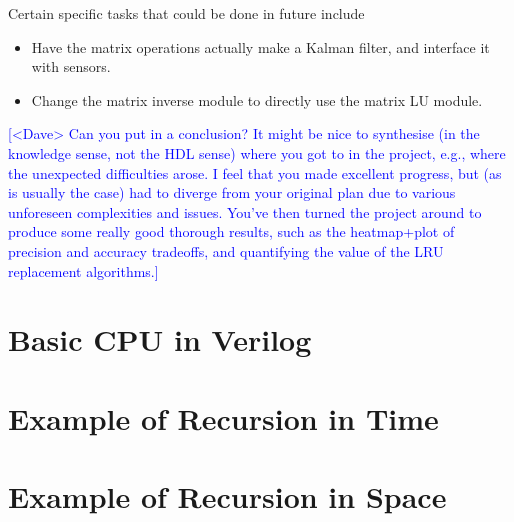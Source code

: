 \documentclass[12pt]{article}
\newcommand{\note}[2][red]{\textcolor{#1}{#2}}
\newcommand{\notedme}[1]{\note[blue]{[<Dave> #1]}}
\begin{document}
Certain specific tasks that could be done in future include

\begin{itemize}
	\item Have the matrix operations actually make a Kalman filter, and interface it with sensors.
	\item Change the matrix inverse module to directly use the matrix LU module.
\end{itemize}

\notedme{Can you put in a conclusion? It might be nice to synthesise (in the knowledge sense, not the HDL sense) where you got to in the project, e.g., where the unexpected difficulties arose. I feel that you made excellent progress, but (as is usually the case) had to diverge from your original plan due to various unforeseen complexities and issues. You've then turned the project around to produce some really good thorough results, such as the heatmap+plot of precision and accuracy tradeoffs, and quantifying the value of the LRU replacement algorithms.}

\printbibliography

\appendix

\renewcommand{\thesection}{Appendix \Alph{section}}

\section{Basic CPU in Verilog}
\label{verilog_cpu}



\section{Example of Recursion in Time}
\label{recursion_time}



\section{Example of Recursion in Space}
\label{recursion_space}


\end{document}
